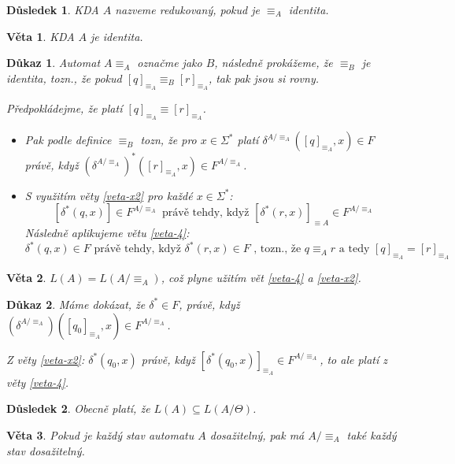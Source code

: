\documentclass[10pt, a4paper, titlepage]{article}
\theoremstyle{note}
\newtheorem{veta}{\textbf{Věta}}
\newtheorem{dukaz}{\textbf{Důkaz}}
\newtheorem{dusledek}{\textbf{Důsledek}}
\begin{document}
\begin{dusledek}
KDA $A$ nazveme redukovan\'y, pokud je $\equiv_{A}$ identita.
\end{dusledek}

\begin{veta}
KDA $A$ je identita.
\end{veta}

\begin{dukaz}
Automat $A \equiv_{A}$ označme jako $B$, n\'asledně prok\'ažeme, že $\equiv_{B}$ je identita,
tozn., že pokud $[q]_{\equiv_{A}} \equiv_{B} [r]_{\equiv_{A}}$,
tak pak jsou si rovny.

Předpokl\'adejme, že plat\'i $[q]_{\equiv_{A}} \equiv [r]_{\equiv_{A}}$.
\begin{itemize}
\item
Pak podle definice $\equiv_{B}$ tozn, že pro $x \in \Sigma^{*}$
plat\'i $\delta^{A/ \equiv_{A}} ([q]_{\equiv_{A}},x) \in F$ pr\'avě,  když
$(\delta^{A/ \equiv_{A}})^{*}([r]_{\equiv_{A}},x) \in F^{A/ \equiv_{A}}$.

\item
S využit\'im věty \ref{veta-x2} pro každ\'e $x \in \Sigma^{*}$:
$$
[\delta^{*}(q,x)] \in F^{A/ \equiv_{A}} \text{ právě tehdy, když } [\delta^{*}(r, x)]_{\equiv{A}} \in F^{A/ \equiv_{A}}
$$
N\'asledně aplikujeme větu \ref{veta-4}:
$$
\delta^{*}(q, x) \in F \text{ pr\'avě tehdy, když } \delta^{*}(r, x) \in F \text{ , tozn., že } q \equiv_{A} r \text{ a tedy } [q]_{\equiv_{A}} = [r]_{\equiv_{A}}
$$
\end{itemize}
\end{dukaz}

\begin{veta}
$L(A) = L(A/ \equiv_{A})$, což plyne užit\'im vět \ref{veta-4} a \ref{veta-x2}.
\end{veta}

\begin{dukaz}
M\'ame dok\'azat, že $\delta^{*} \in F$, pr\'avě, když $(\delta^{A/ \equiv_{A}})([q_{0}]_{\equiv_{A}}, x) \in F^{A/ \equiv_{A}}$.

Z věty \ref{veta-x2}: $\delta^{*}(q_{0},x)$ pr\'avě, když $[\delta^{*}(q_{0}, x)]_{\equiv_{A}} \in F^{A/ \equiv_{A}}$, to ale plat\'i z věty \ref{veta-4}.
\end{dukaz}

\begin{dusledek}
Obecně plat\'i, že $L(A) \subseteq L(A/ \Theta)$.
\end{dusledek}

\begin{veta}
Pokud je každ\'y stav automatu $A$ dosažiteln\'y, pak m\'a $A/ \equiv_{A}$ tak\'e každ\'y stav dosažiteln\'y.
\end{veta}
\end{document}

